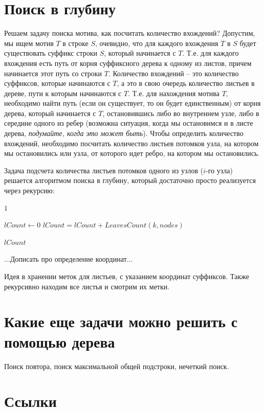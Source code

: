 \documentclass[letterpaper, 11pt]{article}
\begin{document}
\section{Поиск в глубину}
\par
Решаем задачу поиска мотива, как посчитать количество вхождений? Допустим, мы ищем мотив $T$ в строке $S$, очевидно, что для каждого вхождения $T$ в $S$ будет существовать суффикс строки $S$, который начинается с $T$. Т.е. для каждого вхождения есть путь от корня суффиксного дерева к одному из листов, причем начинается этот путь со строки $T$. Количество вхождений -- это количество суффиксов, которые начинаются с $T$, а это в свою очередь количество листьев в дереве, пути к которым начинаются с $T$. Т.е. для нахождения мотива $T$, необходимо найти путь (если он существует, то он будет единственным) от корня дерева, который начинается с $T$, остановившись либо во внутреннем узле, либо в середине одного из ребер (возможна ситуация, когда мы остановимся и в листе дерева, \textit{подумайте, когда это может быть}). Чтобы определить количество вхождений, необходимо посчитать количество листьев потомков узла, на котором мы остановились или узла, от которого идет ребро, на котором мы остановились.

Задача подсчета количества листьев потомков одного из узлов ($i$-го узла) решается алгоритмом поиска в глубину, который достаточно просто реализуется через рекурсию:

\begin{algorithmic}[1]
\State \Return $1$
\EndIf
\item[]
\State $lCount \gets 0$
\State $lCount = lCount + LeavesCount(k, nodes)$
\EndFor
\item[]
\State \Return $lCount$
\EndProcedure
\end{algorithmic}

...Дописать про определение координат...

Идея в хранении меток для листьев, с указанием координат суффиксов. Также рекурсивно находим все листья и смотрим их метки.

\section{Какие еще задачи можно решить с помощью дерева}
\par
Поиск повтора, поиск максимальной общей подстроки, нечеткий поиск.

\section{Ссылки}

\begingroup
\renewcommand{\section}[2]{}%
\begin{thebibliography}{7}


\end{thebibliography}
\endgroup
\end{document}
